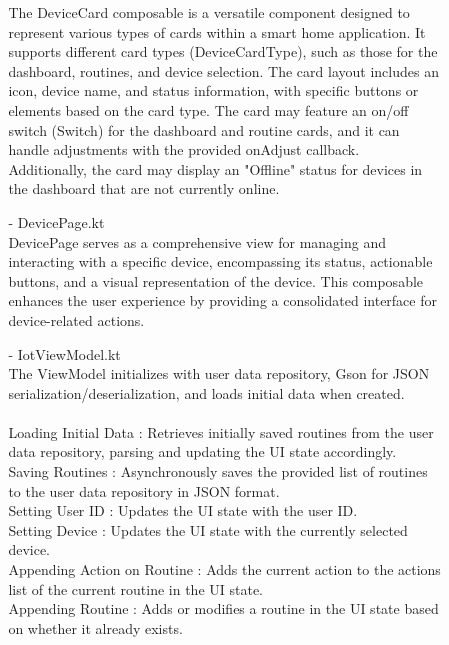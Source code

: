\begin{enumerate}[label=\arabic*]
\begin{enumerate}[label=\alph*]
\begin{enumerate}
                The DeviceCard composable is a versatile component designed to represent various types of cards within a smart home application. It supports different card types (DeviceCardType), such as those for the dashboard, routines, and device selection. The card layout includes an icon, device name, and status information, with specific buttons or elements based on the card type. The card may feature an on/off switch (Switch) for the dashboard and routine cards, and it can handle adjustments with the provided onAdjust callback. Additionally, the card may display an "Offline" status for devices in the dashboard that are not currently online.\\
                \item[-] DevicePage.kt \\
                DevicePage serves as a comprehensive view for managing and interacting with a specific device, encompassing its status, actionable buttons, and a visual representation of the device. This composable enhances the user experience by providing a consolidated interface for device-related actions.\\
                \item[-] IotViewModel.kt \\
                The ViewModel initializes with user data repository, Gson for JSON serialization/deserialization, and loads initial data when created.\\\\
                Loading Initial Data : Retrieves initially saved routines from the user data repository, parsing and updating the UI state accordingly.\\

                Saving Routines : Asynchronously saves the provided list of routines to the user data repository in JSON format.\\

                Setting User ID : Updates the UI state with the user ID.\\

                Setting Device : Updates the UI state with the currently selected device.\\

                Appending Action on Routine : Adds the current action to the actions list of the current routine in the UI state.\\

                Appending Routine : Adds or modifies a routine in the UI state based on whether it already exists.\\


\end{enumerate}
\end{enumerate}
\end{enumerate}
